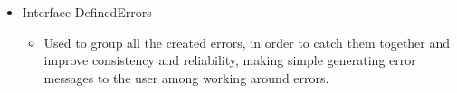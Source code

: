 \begin{flushleft}
\begin{itemize}
\begin{itemize}
        \end{itemize}
    \end{itemize}
    \begin{itemize}
        \item Interface DefinedErrors
        \begin{itemize}
            \item Used to group all the created errors, in order to catch them together and improve consistency and
            reliability, making simple generating error messages to the user among working around errors.
        \end{itemize}
    \end{itemize}
\end{flushleft}